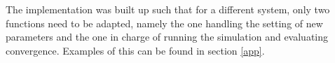 The implementation was built up such that for a different system, only two functions need to be adapted, namely the one handling the setting of new parameters and the one 
in charge of running the simulation and evaluating convergence. Examples of this can be found in section \ref{app}.










